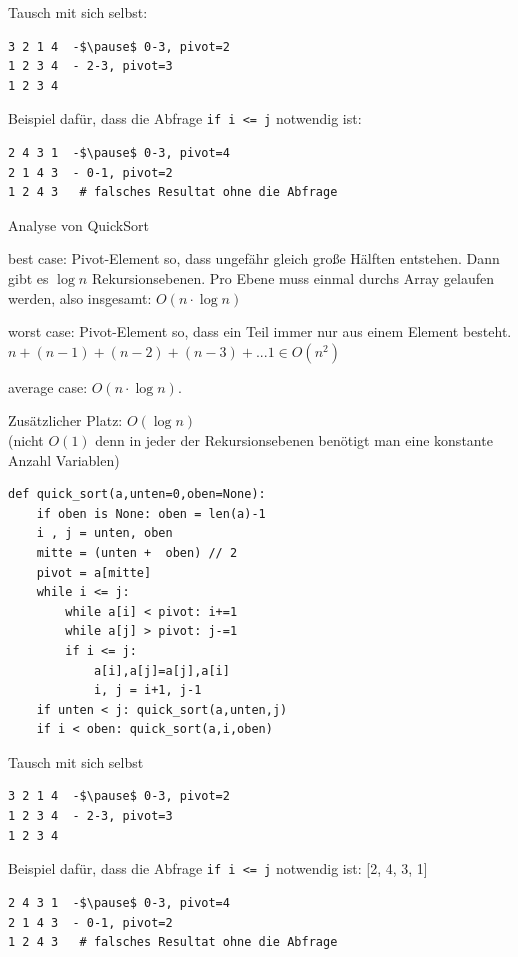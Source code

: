 \documentclass{beamer}
\begin{document}
\begin{frame}[fragile]
Tausch mit sich selbst:
\begin{lstlisting} 
3 2 1 4  -$\pause$ 0-3, pivot=2
1 2 3 4  - 2-3, pivot=3
1 2 3 4
\end{lstlisting} 

Beispiel dafür, dass die Abfrage \texttt{if i <= j} notwendig ist: 
\begin{lstlisting} 
2 4 3 1  -$\pause$ 0-3, pivot=4
2 1 4 3  - 0-1, pivot=2
1 2 4 3   # falsches Resultat ohne die Abfrage
\end{lstlisting}  \pause
\end{frame}


\begin{frame}[fragile]

Analyse von QuickSort

best case: \pause Pivot-Element so, dass ungefähr gleich große Hälften entstehen.  
Dann gibt es $\log n$ Rekursionsebenen. 
Pro Ebene muss einmal durchs Array gelaufen werden,  also insgesamt:  $O(n \cdot \log n)$

worst case: \pause Pivot-Element so, dass ein Teil immer nur aus einem Element besteht. \\ 
$n + (n-1) + (n-2) + (n-3) + ... 1 \in O(n^2)$

average case: $O(n \cdot \log n)$. 

Zusätzlicher Platz: \pause $O(\log n)$ \\
(nicht $O(1)$ denn in jeder der Rekursionsebenen benötigt man eine konstante Anzahl Variablen)

\end{frame}

\begin{frame}[fragile]
\begin{lstlisting} 
def quick_sort(a,unten=0,oben=None):
    if oben is None: oben = len(a)-1
    i , j = unten, oben
    mitte = (unten +  oben) // 2
    pivot = a[mitte]
    while i <= j:
        while a[i] < pivot: i+=1
        while a[j] > pivot: j-=1
        if i <= j:
            a[i],a[j]=a[j],a[i]
            i, j = i+1, j-1
    if unten < j: quick_sort(a,unten,j)
    if i < oben: quick_sort(a,i,oben)
\end{lstlisting} 
\end{frame}

\begin{frame}[fragile]
Tausch mit sich selbst
\begin{lstlisting} 
3 2 1 4  -$\pause$ 0-3, pivot=2
1 2 3 4  - 2-3, pivot=3
1 2 3 4
\end{lstlisting} 

Beispiel dafür, dass die Abfrage \texttt{if i <= j} notwendig ist: [2, 4, 3, 1]  \pause
\begin{lstlisting} 
2 4 3 1  -$\pause$ 0-3, pivot=4
2 1 4 3  - 0-1, pivot=2
1 2 4 3   # falsches Resultat ohne die Abfrage
\end{lstlisting}  \pause
\end{frame}


 
\end{document}
